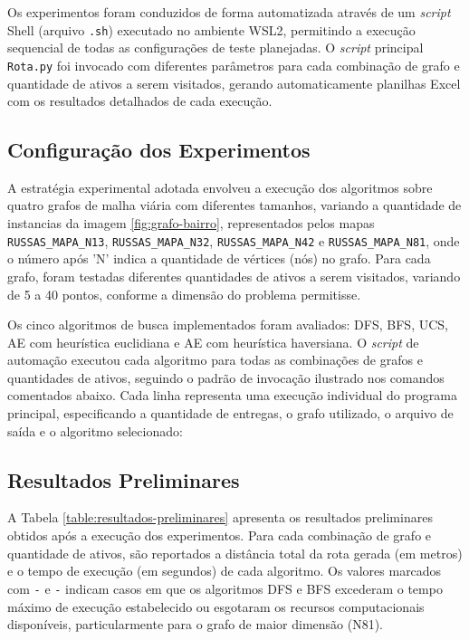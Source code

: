 Os experimentos foram conduzidos de forma automatizada através de um \textit{script} Shell (arquivo 
\texttt{.sh}) executado no ambiente \gls{WSL2}, permitindo a execução sequencial de todas as 
configurações de teste planejadas. O \textit{script} principal \texttt{Rota.py} foi invocado com 
diferentes parâmetros para cada combinação de grafo e quantidade de ativos a serem visitados, 
gerando automaticamente planilhas Excel com os resultados detalhados de cada execução.

\subsection{Configuração dos Experimentos}

A estratégia experimental adotada envolveu a execução dos algoritmos sobre quatro grafos de malha 
viária com diferentes tamanhos, variando a quantidade de instancias da imagem \ref{fig:grafo-bairro},
representados pelos mapas \texttt{RUSSAS\_MAPA\_N13}, 
\texttt{RUSSAS\_MAPA\_N32}, \texttt{RUSSAS\_MAPA\_N42} e \texttt{RUSSAS\_MAPA\_N81}, onde o 
número após 'N' indica a quantidade de vértices (nós) no grafo. Para cada grafo, foram testadas 
diferentes quantidades de ativos a serem visitados, variando de 5 a 40 pontos, conforme a dimensão 
do problema permitisse.

Os cinco algoritmos de busca implementados foram avaliados: \gls{DFS}, \gls{BFS}, \gls{UCS}, 
\gls{AE} com heurística euclidiana e \gls{AE} com heurística haversiana. O \textit{script} de 
automação executou cada algoritmo para todas as combinações de grafos e quantidades de ativos, 
seguindo o padrão de invocação ilustrado nos comandos comentados abaixo. Cada linha representa uma 
execução individual do programa principal, especificando a quantidade de entregas, o grafo 
utilizado, o arquivo de saída e o algoritmo selecionado:


\subsection{Resultados Preliminares}

A Tabela \ref{table:resultados-preliminares} apresenta os resultados preliminares obtidos após a execução dos experimentos. 
Para cada combinação de grafo e quantidade de ativos, são reportados a distância total da rota 
gerada (em metros) e o tempo de execução (em segundos) de cada algoritmo. Os valores marcados 
com \texttt{-} e \texttt{-} indicam casos em que os algoritmos \gls{DFS} e \gls{BFS} 
excederam o tempo máximo de execução estabelecido ou esgotaram os recursos computacionais 
disponíveis, particularmente para o grafo de maior dimensão (N81).

